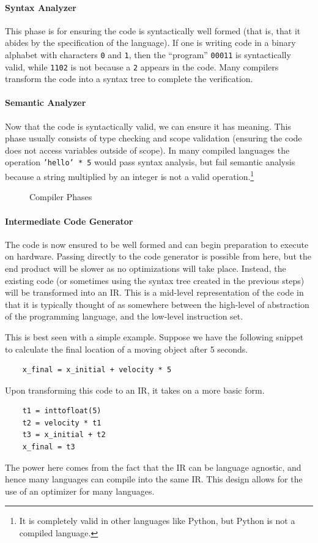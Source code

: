 \paragraph{Syntax Analyzer}
This phase is for ensuring the code is syntactically well formed (that is, that it abides by the specification of the language).
If one is writing code in a binary alphabet with characters \texttt{0} and \texttt{1}, then the ``program'' \texttt{00011} is syntactically valid, while \texttt{1102} is not because a \texttt{2} appears in the code.
Many compilers transform the code into a syntax tree to complete the verification.

\paragraph{Semantic Analyzer}
Now that the code is syntactically valid, we can ensure it has meaning.
This phase usually consists of type checking and scope validation (ensuring the code does not access variables outside of scope).
In many compiled languages the operation \texttt{'hello' * 5} would pass syntax analysis, but fail semantic analysis because a string multiplied by an integer is not a valid operation.\footnote{It is completely valid in other languages like Python, but Python is not a compiled language.}

\begin{figure} %
    \centering
    
    \caption{Compiler Phases}\label{fig:compilerphases} %
\end{figure}

\paragraph{Intermediate Code Generator}
The code is now ensured to be well formed and can begin preparation to execute on hardware.
Passing directly to the code generator is possible from here, but the end product will be slower as no optimizations will take place.
Instead, the existing code (or sometimes using the syntax tree created in the previous steps) will be transformed into an \acf{IR}.
This is a mid-level representation of the code in that it is typically thought of as somewhere between the high-level of abstraction of the programming language, and the low-level instruction set.

This is best seen with a simple example.
Suppose we have the following snippet to calculate the final location of a moving object after 5 seconds.
\begin{lstlisting}
    x_final = x_initial + velocity * 5
\end{lstlisting}
Upon transforming this code to an \ac{IR}, it takes on a more basic form.
\begin{lstlisting}
    t1 = inttofloat(5)
    t2 = velocity * t1
    t3 = x_initial + t2
    x_final = t3
\end{lstlisting}
The power here comes from the fact that the \acf{IR} can be language agnostic, and hence many languages can compile into the same \ac{IR}.
This design allows for the use of an optimizer for many languages.

